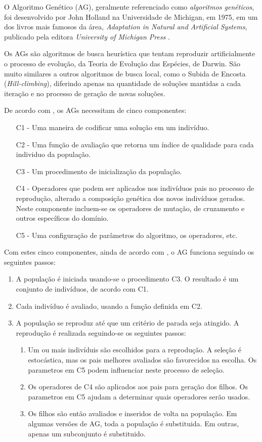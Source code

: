 \documentclass[12pt]{article}
\begin{document}
\par O Algoritmo Genético (AG), geralmente referenciado como \emph{algoritmos genéticos}, foi desenvolvido por John Holland na Universidade de Michigan, em 1975, em um dos livros mais famosos da área, \emph{Adaptation in Natural and Artificial Systems}, publicado pela editora \emph{University of Michigan Press} \cite{essentials:pop}.
\par Os AGs são algoritmos de busca heurística que tentam reproduzir artificialmente o processo de evolução, da Teoria de Evolução das Espécies, de Darwin. São muito similares a outros algoritmos de busca local, como o Subida de Encosta (\textit{Hill-climbing}), diferindo apenas na quantidade de soluções mantidas a cada iteração e no processo de geração de novas soluções.
\par De acordo com \cite{montana}, os AGs necessitam de cinco componentes:
\begin{enumerate}
\item[C1] - Uma maneira de codificar uma solução em um indivíduo.
\item[C2] - Uma função de avaliação que retorna um índice de qualidade para cada individuo da população.
\item[C3] - Um procedimento de inicialização da população.
\item[C4] - Operadores que podem ser aplicados nos indivíduos pais no processo de reprodução, alterado a composição genética dos novos indivíduos gerados. Neste componente incluem-se os operadores de mutação, de cruzamento e outros específicos do domínio.
\item[C5] - Uma configuração de parâmetros do algoritmo, os operadores, etc.
\end{enumerate}
Com estes cinco componentes, ainda de acordo com \cite{montana}, o AG funciona seguindo os seguintes passos:
\begin{enumerate}
	\item A população é iniciada usando-se o procedimento C3. O resultado é um conjunto de indivíduos, de acordo com C1.
	\item Cada indivíduo é avaliado, usando a função definida em C2.
	\item A população se reproduz até que um critério de parada seja atingido. A reprodução é realizada seguindo-se os seguintes passos:
	 \begin{enumerate}
		\item Um ou mais indivíduis são escolhidos para a reprodução. A seleção é estocástica, mas os pais melhores avaliados são favorecidos na escolha. Os parametros em C5 podem influenciar neste processo de seleção.
		\item Os operadores de C4 são aplicados aos pais para geração dos filhos. Os parametros em C5 ajudam a determinar quais operadores serão usados.
		\item Os filhos são então avaliados e inseridos de volta na população. Em algumas versões de AG, toda a população é substituida. Em outras, apenas um subconjunto é substituido.		
	\end{enumerate}
\end{enumerate}
\end{document}
